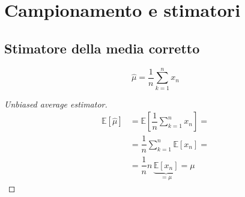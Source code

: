 \section{Campionamento e stimatori}
\begin{definition}
\end{definition}

\subsection{Stimatore della media corretto}
\begin{equation}
    \widehat{\mu} = \dfrac{1}{n} \sum_{k=1}^{n} x_n
\end{equation}

\begin{proof}[Unbiased average estimator]
\begin{equation}
\begin{aligned}
    \mathbb{E}[\widehat{\mu}]
    & = \mathbb{E}\left[\dfrac{1}{n} \sum_{k=1}^n x_n \right] = \\
    & = \dfrac{1}{n} \sum_{k=1}^n \mathbb{E}\left[ x_n \right] = \\
    & = \dfrac{1}{n} n \, \underbrace{\mathbb{E}\left[ x_n \right]}_{=\mu} = \mu
\end{aligned}
\end{equation}
\end{proof}

